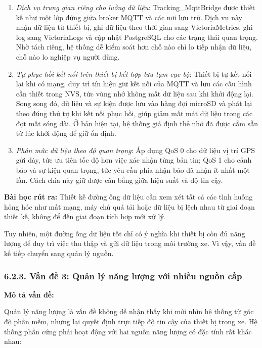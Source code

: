 \documentclass[a4paper]{extarticle}
\providecommand{\tightlist}{%
  \setlength{\itemsep}{0pt}\setlength{\parskip}{0pt}}
\begin{document}
\begin{enumerate}
\def\labelenumi{\arabic{enumi}.}
\tightlist
\item
  \emph{Dịch vụ trung gian riêng cho luồng dữ liệu}: Tracking\_MqttBridge
  được thiết kế như một lớp đứng giữa broker MQTT và các nơi lưu trữ.
  Dịch vụ này nhận dữ liệu từ thiết bị, ghi dữ liệu theo thời gian sang
  VictoriaMetrics, ghi log sang VictoriaLogs và cập nhật PostgreSQL cho
  các trạng thái quan trọng. Nhờ tách riêng, hệ thống dễ kiểm soát hơn
  chỗ nào chỉ lo tiếp nhận dữ liệu, chỗ nào lo nghiệp vụ người dùng.
\item
  \emph{Tự phục hồi kết nối trên thiết bị kết hợp lưu tạm cục bộ}: Thiết
  bị tự kết nối lại khi có mạng, duy trì tín hiệu giữ kết nối của MQTT và lưu
  các cấu hình cần thiết trong NVS, tức vùng nhớ không mất dữ liệu sau
  khi khởi động lại. Song song đó, dữ liệu và sự kiện được lưu vào hàng
  đợi microSD và phát lại theo đúng thứ tự khi kết nối phục hồi, giúp
  giảm mất mát dữ liệu trong các đợt mất sóng dài. Ở bản hiện tại, hệ
  thống giả định thẻ nhớ đã được cắm sẵn từ lúc khởi động để giữ ổn
  định.
\item
  \emph{Phân mức dữ liệu theo độ quan trọng}: Áp dụng QoS 0 cho dữ liệu
  vị trí GPS gửi dày, tức ưu tiên tốc độ hơn việc xác nhận từng bản tin;
  QoS 1 cho cảnh báo và sự kiện quan trọng, tức yêu cầu phía nhận báo đã
  nhận ít nhất một lần. Cách chia này giữ được cân bằng giữa hiệu suất
  và độ tin cậy.
\end{enumerate}

\textbf{Bài học rút ra:} Thiết kế đường ống dữ liệu cần xem xét tất cả
các tình huống hỏng hóc như mất mạng, máy chủ quá tải hoặc dữ liệu bị lệch nhau
từ giai đoạn thiết kế, không để đến giai đoạn tích hợp mới xử lý.

Tuy nhiên, một đường ống dữ liệu tốt chỉ có ý nghĩa khi thiết bị còn đủ
năng lượng để duy trì việc thu thập và gửi dữ liệu trong môi trường xe.
Vì vậy, vấn đề kế tiếp chuyển sang quản lý nguồn.

\subsubsection{6.2.3. Vấn đề 3: Quản lý năng lượng với nhiều nguồn
cấp}\label{623-vux1ea5n-ux111ux1ec1-3-quux1ea3n-luxfd-nux103ng-lux1b0ux1ee3ng-vux1edbi-nhiux1ec1u-nguux1ed3n-cux1ea5p}

\textbf{Mô tả vấn đề:}

Quản lý năng lượng là vấn đề không dễ nhận thấy khi mới nhìn hệ thống từ
góc độ phần mềm, nhưng lại quyết định trực tiếp độ tin cậy của thiết bị
trong xe. Hệ thống phần cứng phải hoạt động với hai nguồn năng lượng có
đặc tính rất khác nhau:
\end{document}
